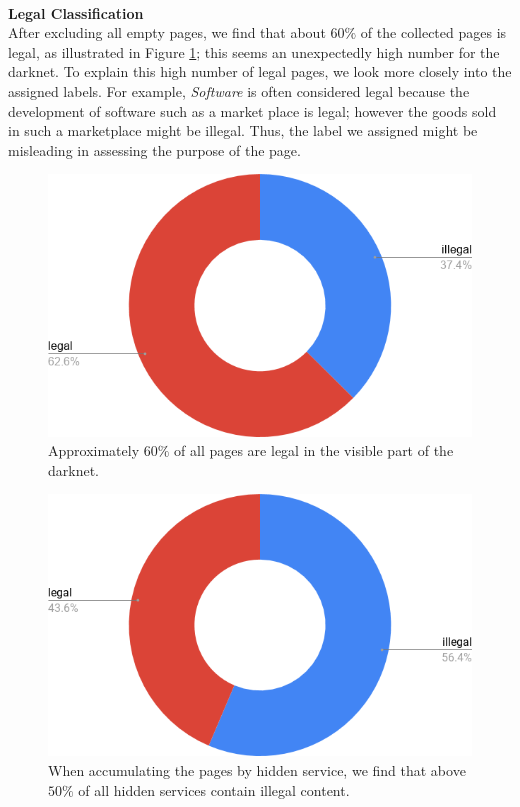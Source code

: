 \documentclass[USenglish,oneside,twocolumn]{article}
\newcommand{\sh}[1]{\noindent\vspace{0.5\baselineskip}\\ \textbf{#1}\\}
\begin{document}
\sh{Legal Classification}
After excluding all empty pages, we find that about $60\%$ of the collected pages is legal, as illustrated in Figure \ref{fig:legalByContent}; this seems an unexpectedly high number for the darknet. To explain this high number of legal pages, we look more closely into the assigned labels. 
For example, \emph{Software} is often considered legal because the development of software such as a market place is legal; however the goods sold in such a marketplace might be illegal. Thus, the label we assigned might be misleading in assessing the purpose of the page.

\begin{figure}[t]
    \includegraphics[width=\linewidth]{images/legalByContent.png}
    \caption{Approximately $60\%$ of all pages are legal in the visible part of the darknet.}
    \label{fig:legalByContent}
\end{figure}

\begin{figure}[t]
    \includegraphics[width=\linewidth]{images/legalByHost.png}
    \caption{When accumulating the pages by hidden service, we find that above $50\%$ of all hidden services contain illegal content.}
    \label{fig:legalByHost}
\end{figure}
\end{document}

